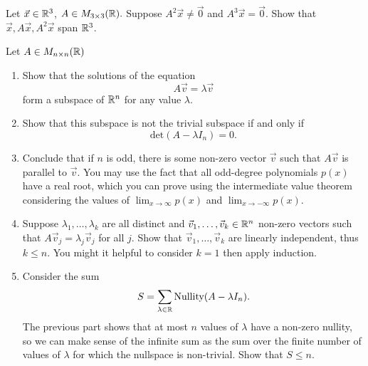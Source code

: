 \begin{exerciselist}
	\item Let $\vec{x}\in \mathbb{R}^3$, $A\in M_{3\times 3}(\mathbb{R}).$ Suppose $A^2\vec{x}\neq\vec{0}$ and $A^3\vec{x}=\vec{0}$. Show that $\vec{x}, A\vec{x},A^2\vec{x}$ span $\mathbb{R}^3$.
	\item Let $A\in M_{n\times n}(\mathbb{R})$
	\begin{enumerate}[label=(\alph*)]
		\item Show that the solutions of the equation \[
			A\vec{v}=\lambda \vec{v}
			\]form a subspace of $\mathbb{R}^n$ for any value $\lambda$.
		\item Show that this subspace is not the trivial subspace if and only if \[
		\textrm{det}(A-\lambda I_n)=0.
		\]
		\item Conclude that if $n$ is odd, there is some non-zero vector $\vec{v}$ such that $A\vec{v}$ is parallel to $\vec{v}$. You may use the fact that all odd-degree polynomials $p(x)$ have a real root, which you can prove using the intermediate value theorem considering the values of $\lim_{x\to \infty}p(x)$ and $\lim_{x\to -\infty}p(x)$. 
		\item Suppose $\lambda_1,\ldots,\lambda_k$ are all distinct and $\vec{v}_1,\ldots,\vec{v}_k\in \mathbb{R}^n$ non-zero vectors such that $A\vec{v}_j=\lambda_j\vec{v}_j$ for all $j$. Show that $\vec{v}_1,\ldots ,\vec{v}_k$ are linearly independent, thus $k\leq n$. You might it helpful to consider $k=1$ then apply induction.
		\item Consider the sum \[
		S=\sum_{\lambda\in\mathbb{R}} \textrm{Nullity}(A-\lambda I_n).
		\]
		The previous part shows that at most $n$ values of $\lambda$ have a non-zero nullity, so we can make sense of the infinite sum as the sum over the finite number of values of $\lambda$ for which the nullspace is non-trivial. Show that $S\leq n$.
	\end{enumerate}
\end{exerciselist}
